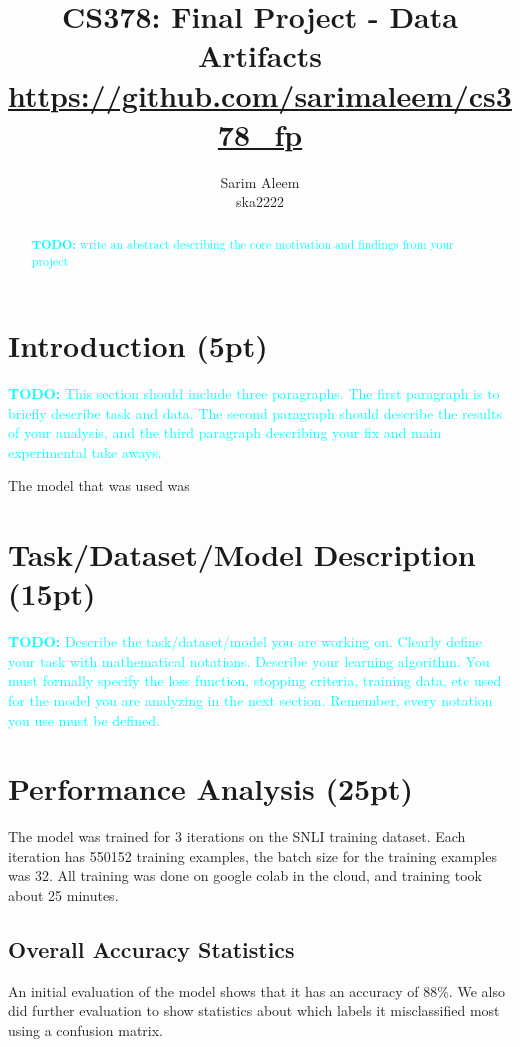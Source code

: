 \documentclass[twocolumn]{article}
\title{CS378: Final Project - Data Artifacts \\ \url{https://github.com/sarimaleem/cs378_fp}}
\author{Sarim Aleem \\ ska2222}
\date{}
\newcommand{\todo}[1]{\textcolor{cyan}{\textbf{TODO:} #1}}
\begin{document}
\maketitle


\begin{abstract}
    \todo{write an abstract describing the core motivation and findings from your project}
\end{abstract}

\section{Introduction (5pt)}

\todo{This section should include three paragraphs. The first paragraph is to
briefly describe task and data. The second paragraph should describe the
results of your analysis, and the third paragraph describing your fix and main
experimental take aways. }

The model that was used was \cite{clark2020electra}


\section{Task/Dataset/Model Description (15pt)}

\todo{Describe the task/dataset/model you are working on. Clearly define your
task with mathematical notations. Describe your learning algorithm. You must
formally specify the loss function, stopping criteria, training data, etc used
for the model you are analyzing in the next section. Remember, every notation
you use must be defined.}

\section{Performance Analysis (25pt)}

The model was trained for 3 iterations on the SNLI training dataset. Each
iteration has 550152 training examples, the batch size for the training examples
was 32. All training was done on google colab in the cloud, and training took
about 25 minutes.

\subsection*{Overall Accuracy Statistics}

An initial evaluation of the model shows that it has an accuracy of 88\%. We
also did further evaluation to show statistics about which labels it
misclassified most using a confusion matrix.
\end{document}
